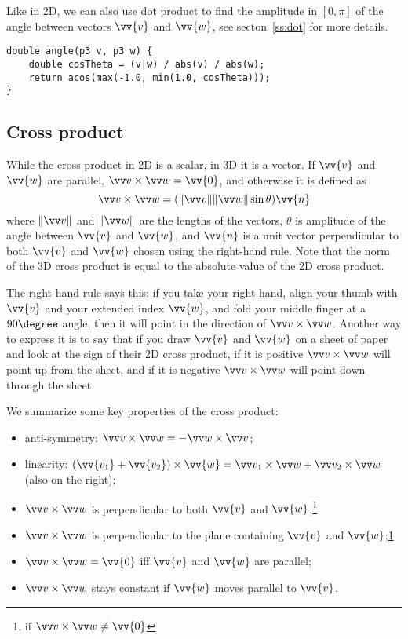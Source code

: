 Like in 2D, we can also use dot product to find the amplitude in $[0,\pi]$ of the angle between vectors $\vv{v}$ and $\vv{w}$, see secton~\ref{ss:dot} for more details.
\begin{lstlisting}
double angle(p3 v, p3 w) {
    double cosTheta = (v|w) / abs(v) / abs(w);
    return acos(max(-1.0, min(1.0, cosTheta)));
}
\end{lstlisting}

\subsection{Cross product}
While the cross product in 2D is a scalar, in 3D it is a vector. If $\vv{v}$ and $\vv{w}$ are parallel, $\crossv{v}{w} = \vv{0}$, and otherwise it is defined as
\[\crossv{v}{w} = (\normv{v}\normv{w} \sin\theta)\vv{n}\]
where $\normv{v}$ and $\normv{w}$ are the lengths of the vectors, $\theta$ is amplitude of the angle between $\vv{v}$ and $\vv{w}$, and $\vv{n}$ is a unit vector perpendicular to both $\vv{v}$ and $\vv{w}$ chosen using the right-hand rule. Note that the norm of the 3D cross product is equal to the absolute value of the 2D cross product.


The right-hand rule says this: if you take your right hand, align your thumb with $\vv{v}$ and your extended index $\vv{w}$, and fold your middle finger at a $90\degree$ angle, then it will point in the direction of $\crossv{v}{w}$. Another way to express it is to say that if you draw $\vv{v}$ and $\vv{w}$ on a sheet of paper and look at the sign of their 2D cross product, if it is positive $\crossv{v}{w}$ will point up from the sheet, and if it is negative $\crossv{v}{w}$ will point down through the sheet.


We summarize some key properties of the cross product:
\begin{itemize}
\item anti-symmetry: $\crossv{v}{w} = -\crossv{w}{v}$;
\item linearity: $(\vv{v_1}+\vv{v_2})\times\vv{w} = \crossv{v_1}{w} + \crossv{v_2}{w}$ (also on the right);
\item $\crossv{v}{w}$ is perpendicular to both $\vv{v}$ and $\vv{w}$;\footnote{\label{f:if-not-zero}if $\crossv{v}{w} \neq \vv{0}$}
\item $\crossv{v}{w}$ is perpendicular to the plane containing $\vv{v}$ and $\vv{w}$;\cref{f:if-not-zero}
\item $\crossv{v}{w} = \vv{0}$ iff $\vv{v}$ and $\vv{w}$ are parallel;
\item $\crossv{v}{w}$ stays constant if $\vv{w}$ moves parallel to $\vv{v}$.
\end{itemize}

